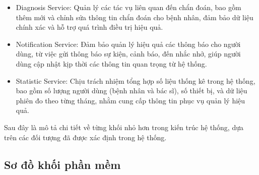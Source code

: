 \begin{adjustwidth}{1.5em}{}
\begin{itemize}
		\item Diagnosis Service: Quản lý các tác vụ liên quan đến chẩn đoán, bao gồm thêm mới và chỉnh sửa thông tin chẩn đoán cho bệnh nhân, đảm bảo dữ liệu chính xác và hỗ trợ quá trình điều trị hiệu quả.
		\item Notification Service: Đảm bảo quản lý hiệu quả các thông báo cho người dùng, từ việc gửi thông báo sự kiện, cảnh báo, đến nhắc nhở,
		      giúp người dùng cập nhật kịp thời các thông tin quan trọng từ hệ thống.
		\item Statistic Service: Chịu trách nhiệm tổng hợp số liệu thống kê trong hệ thống, bao gồm số lượng người dùng (bệnh nhân và bác sĩ),
		      số thiết bị, và dữ liệu phiên đo theo từng tháng, nhằm cung cấp thông tin phục vụ quản lý hiệu quả.
	\end{itemize}
\end{adjustwidth}

Sau đây là mô tả chi tiết về từng khối nhỏ hơn trong kiến trúc hệ thống, dựa trên các đối tượng đã được xác định trong hệ thống.
\newpage
\subsection{Sơ đồ khối phần mềm}

